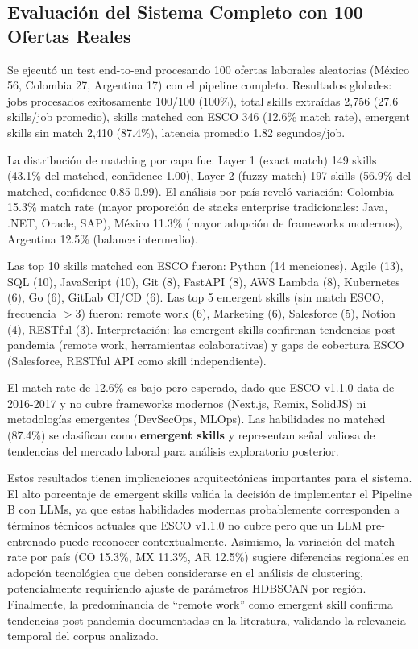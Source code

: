 \subsection{Evaluación del Sistema Completo con 100 Ofertas Reales}

Se ejecutó un test end-to-end procesando 100 ofertas laborales aleatorias (México 56, Colombia 27, Argentina 17) con el pipeline completo. Resultados globales: jobs procesados exitosamente 100/100 (100\%), total skills extraídas 2,756 (27.6 skills/job promedio), skills matched con ESCO 346 (12.6\% match rate), emergent skills sin match 2,410 (87.4\%), latencia promedio 1.82 segundos/job.

La distribución de matching por capa fue: Layer 1 (exact match) 149 skills (43.1\% del matched, confidence 1.00), Layer 2 (fuzzy match) 197 skills (56.9\% del matched, confidence 0.85-0.99). El análisis por país reveló variación: Colombia 15.3\% match rate (mayor proporción de stacks enterprise tradicionales: Java, .NET, Oracle, SAP), México 11.3\% (mayor adopción de frameworks modernos), Argentina 12.5\% (balance intermedio).

Las top 10 skills matched con ESCO fueron: Python (14 menciones), Agile (13), SQL (10), JavaScript (10), Git (8), FastAPI (8), AWS Lambda (8), Kubernetes (6), Go (6), GitLab CI/CD (6). Las top 5 emergent skills (sin match ESCO, frecuencia $>$3) fueron: remote work (6), Marketing (6), Salesforce (5), Notion (4), RESTful (3). Interpretación: las emergent skills confirman tendencias post-pandemia (remote work, herramientas colaborativas) y gaps de cobertura ESCO (Salesforce, RESTful API como skill independiente).

El match rate de 12.6\% es bajo pero esperado, dado que ESCO v1.1.0 data de 2016-2017 y no cubre frameworks modernos (Next.js, Remix, SolidJS) ni metodologías emergentes (DevSecOps, MLOps). Las habilidades no matched (87.4\%) se clasifican como \textbf{emergent skills} y representan señal valiosa de tendencias del mercado laboral para análisis exploratorio posterior.

Estos resultados tienen implicaciones arquitectónicas importantes para el sistema. El alto porcentaje de emergent skills valida la decisión de implementar el Pipeline B con LLMs, ya que estas habilidades modernas probablemente corresponden a términos técnicos actuales que ESCO v1.1.0 no cubre pero que un LLM pre-entrenado puede reconocer contextualmente. Asimismo, la variación del match rate por país (CO 15.3\%, MX 11.3\%, AR 12.5\%) sugiere diferencias regionales en adopción tecnológica que deben considerarse en el análisis de clustering, potencialmente requiriendo ajuste de parámetros HDBSCAN por región. Finalmente, la predominancia de ``remote work'' como emergent skill confirma tendencias post-pandemia documentadas en la literatura, validando la relevancia temporal del corpus analizado.

